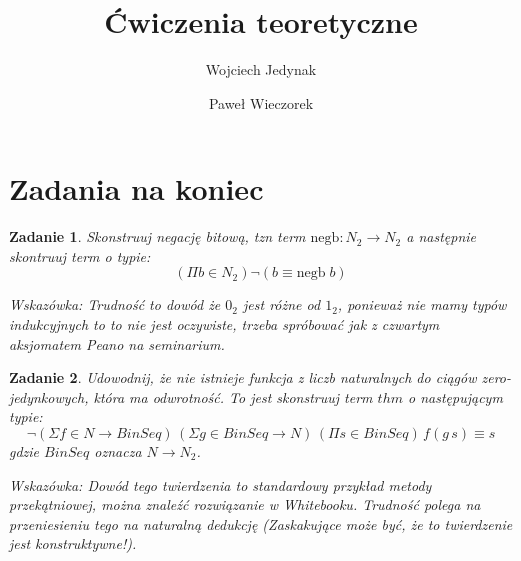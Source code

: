 \documentclass[10pt, a4paper]{article}
\author{Wojciech Jedynak \and Paweł Wieczorek}
\title{Ćwiczenia teoretyczne}
\newtheorem{zadanie}{Zadanie}
\begin{document}
\maketitle

\section{Zadania na koniec}


\begin{zadanie}
 Skonstruuj negację bitową, tzn term $\mbox{negb} : N_2 \to N_2$ a następnie skontruuj term o typie:
\[
 (\Pi b \in N_2) \neg (b \equiv \mbox{negb}\;b)
\]

Wskazówka: Trudność to dowód że $0_2$ jest różne od $1_2$, ponieważ nie mamy typów indukcyjnych to to nie jest
oczywiste, trzeba spróbować jak z czwartym aksjomatem Peano  na seminarium.
\end{zadanie}

\begin{zadanie}
 Udowodnij, że nie istnieje funkcja z liczb naturalnych do ciągów zero-jedynkowych, która ma odwrotność.
To jest skonstruuj
 term $thm$ o następującym typie:
\[
 \neg (\Sigma f \in N \to BinSeq)\, (\Sigma g \in BinSeq \to N)\,
(\Pi s \in BinSeq)\,f (g\, s) \equiv s 
\]
gdzie $BinSeq$ oznacza $N \to N_2$.

Wskazówka: Dowód tego twierdzenia to standardowy przykład metody przekątniowej, można znaleźć rozwiązanie w Whitebooku.
Trudność polega na przeniesieniu tego na naturalną dedukcję (Zaskakujące może być, że to twierdzenie jest konstruktywne!).

\end{zadanie}
\end{document}

